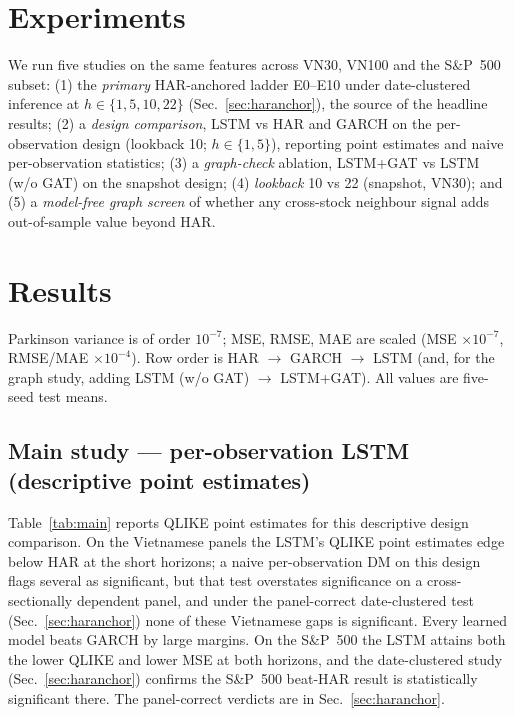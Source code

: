 \documentclass[runningheads]{llncs}
\begin{document}
\section{Experiments}
We run five studies on the same features across VN30, VN100 and the S\&P~500 subset: (1) the
\emph{primary} HAR-anchored ladder E0--E10 under date-clustered inference at $h\in\{1,5,10,22\}$
(Sec.~\ref{sec:haranchor}), the source of the headline results; (2) a \emph{design comparison}, LSTM vs HAR
and GARCH on the per-observation design (lookback 10; $h\in\{1,5\}$), reporting point estimates and naive
per-observation statistics; (3) a \emph{graph-check} ablation, LSTM+GAT vs LSTM (w/o GAT) on the snapshot
design; (4) \emph{lookback} 10 vs 22 (snapshot, VN30); and (5) a \emph{model-free graph screen} of whether
any cross-stock neighbour signal adds out-of-sample value beyond HAR.

\section{Results}
Parkinson variance is of order $10^{-7}$; MSE, RMSE, MAE are scaled (MSE $\times10^{-7}$, RMSE/MAE
$\times10^{-4}$). Row order is HAR $\to$ GARCH $\to$ LSTM (and, for the graph study, adding LSTM (w/o GAT)
$\to$ LSTM+GAT). All values are five-seed test means.

\subsection{Main study --- per-observation LSTM (descriptive point estimates)}
Table~\ref{tab:main} reports QLIKE point estimates for this descriptive design comparison. On the Vietnamese
panels the LSTM's QLIKE point estimates edge below HAR at the short horizons; a naive per-observation DM on this
design flags several as significant, but that test overstates significance on a cross-sectionally dependent
panel, and under the panel-correct date-clustered test (Sec.~\ref{sec:haranchor}) none of these Vietnamese gaps
is significant. Every learned model beats GARCH by large margins. On the S\&P~500 the LSTM attains both the
lower QLIKE and lower MSE at both horizons, and the date-clustered study (Sec.~\ref{sec:haranchor}) confirms the
S\&P~500 beat-HAR result is statistically significant there. The panel-correct verdicts are in
Sec.~\ref{sec:haranchor}.
\end{document}
